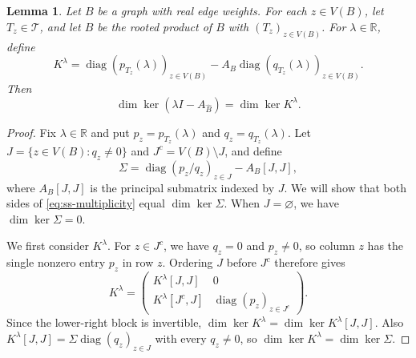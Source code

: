 \documentclass[11pt,a4paper]{article}
\theoremstyle{plain}
\newtheorem{lemma}[theorem]{Lemma}
\theoremstyle{definition}
\DeclareMathOperator{\diag}{diag}
\newcommand{\R}{\mathbb{R}}
\begin{document}
\begin{lemma}\label{lem:ss-rooted-multiplicity}
Let $B$ be a graph with real edge weights.
For each $z\in V(B)$, let $T_z\in\mathcal T$, and let $\widehat B$ be the
rooted product of $B$ with $(T_z)_{z\in V(B)}$.
For $\lambda\in\R$, define
\begin{equation}\label{eq:ss-rooted-core}
 K^\lambda=\diag(p_{T_z}(\lambda))_{z\in V(B)}
       -A_B\diag(q_{T_z}(\lambda))_{z\in V(B)}.
\end{equation}
Then
\begin{equation}\label{eq:ss-multiplicity}
 \dim\ker(\lambda I-A_{\widehat B})=\dim\ker K^\lambda.
\end{equation}
\end{lemma}
\begin{proof}
Fix $\lambda\in\R$ and put
$p_z=p_{T_z}(\lambda)$ and $q_z=q_{T_z}(\lambda)$.
Let $J=\{z\in V(B):q_z\ne0\}$ and $J^c=V(B)\setminus J$, and define
\begin{equation}\label{eq:ss-schur-core}
 \Sigma=\diag(p_z/q_z)_{z\in J}-A_{B}[J,J],
\end{equation}
where $A_{B}[J,J]$ is the principal submatrix indexed by $J$.
We will show that both sides of \cref{eq:ss-multiplicity} equal
$\dim\ker \Sigma$.
When $J=\varnothing$, we have $\dim\ker \Sigma=0$.

We first consider $K^\lambda$.
For $z\in J^c$, we have $q_z=0$ and $p_z\ne0$, so column $z$
has the single nonzero entry $p_z$ in row $z$.
Ordering $J$ before $J^c$ therefore gives
\begin{equation}\label{eq:ss-core-partition}
 K^\lambda=
 \begin{pmatrix}
 K^\lambda[J,J]&0\\
 K^\lambda[J^c,J]&\diag(p_z)_{z\in J^c}
 \end{pmatrix}.
\end{equation}
Since the lower-right block is invertible,
$\dim\ker K^\lambda=\dim\ker K^\lambda[J,J]$.
Also $K^\lambda[J,J]=\Sigma\diag(q_z)_{z\in J}$ with every $q_z\ne0$,
so $\dim\ker K^\lambda=\dim\ker \Sigma$.


\end{proof}
\end{document}
